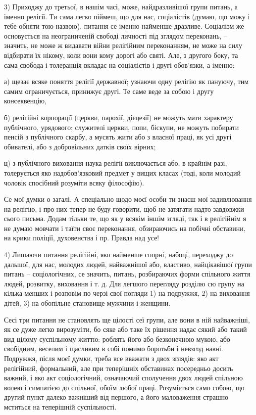 3) Приходжу до третьої, в нашім часі, може, найдразливішої групи питань, а
іменно релігії. Ти сама легко піймеш, що для нас, соціалістів (думаю, що можу і
тебе обняти тою назвою), питання се іменно найменше дразливе. Соціалізм же
основується на неограниченій свободі личності під зглядом переконань, –
значить, не може ж видавати війни релігійним переконанням, не може на силу
відбирати їх нікому, коли вони кому дорогі або святі. Але, з другого боку, та
сама свобода і толеранція вкладає на соціалістів і другі обов’язки, а іменно:

а) щезає всяке поняття релігії державної; узнаючи одну релігію як пануючу, тим самим ограничується, принижує другі. Те саме веде за собою і другу консеквенцію,

б) релігійні корпорації (церкви, парохії, дієцезії) не можуть мати характеру публічного, урядового; служителі церкви, попи, біскупи, не можуть побирати пенсій з публічного скарбу, а мусять жити або з власної праці, як усі другі обивателі, або з добровільних датків своїх вірних;

ц) з публічного виховання наука релігії виключається або, в крайнім разі, толерується яко надобов’язковий предмет у вищих класах (тоді, коли молодий чоловік спосібний розуміти всяку філософію).

Се мої думки о загалі. А спеціально щодо моєї особи ти знаєш мої задивлювання
на релігію, і про них тепер не буду говорити, щоб не затягати надто завдовжки
сього письма. Додам тільки те, що як у всякім іншім згляді, так і в релігійнім
я не думаю мовчати і таїти своє переконання, обзираючись на побічні обставини,
на крики поліції, духовенства і пр. Правда над усе!

4) Лишаючи питання релігійні, яко найменше спорні, набоці, переходжу до
дальшої, для нас, молодих людей, найважнішої або, властиво, найцікавішої групи
питань – соціологічних, се значить, питань, розбираючих форми спільного життя
людей, розвитку, виховання і т. д. Для легшого перегляду розділю сю групу на
кілька менших і розповім по черзі свої погляди 1) на подружжя, 2) на виховання
дітей, 3) на обопільне становище мужчини і женщини.

Сесі три питання не становлять ще цілості сеї групи, але вони в ній найважніші,
як се дуже легко вирозуміти, бо сяке або таке їх рішення надає сякий або такий
вид цілому суспільному життю: роблять його або безконечною мукою, або
свобідним, веселим і щасливим в собі помимо боротьби і невзгод навні. Подружжя,
після моєї думки, треба все вважати з двох зглядів: яко акт релігійний,
формальний, але при теперішніх обставинах посередньо досить важний, і яко акт
соціологічний, означаючий сполучення двох людей спільною волею і симпатією до
спільної, обоїм любої праці. Розуміється само собою, що другий пункт далеко
важніший від першого, а його маловаження страшно мститься на теперішній
суспільності.

